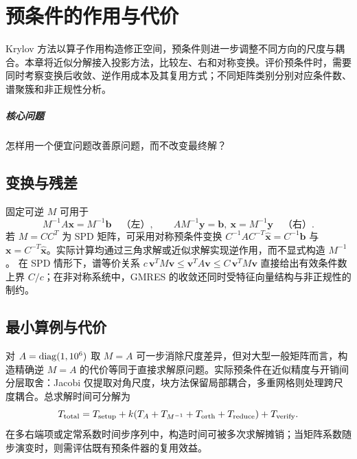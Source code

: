 \chapter{预条件的作用与代价}\label{v0ch:16}
\begin{chaptersummary}
Krylov 方法以算子作用构造修正空间，预条件则进一步调整不同方向的尺度与耦合。本章将近似分解接入投影方法，比较左、右和对称变换。评价预条件时，需要同时考察变换后收敛、逆作用成本及其复用方式；不同矩阵类别分别对应条件数、谱聚簇和非正规性分析。
\end{chaptersummary}
\paragraph{核心问题}怎样用一个便宜问题改善原问题，而不改变最终解？

\section{变换与残差}
固定可逆 $M$ 可用于
\[
 M^{-1}A\bm x=M^{-1}\bm b\quad\text{（左）},\qquad
 AM^{-1}\bm y=\bm b,\ \bm x=M^{-1}\bm y\quad\text{（右）}.
\]
若 $M=CC^T$ 为 SPD 矩阵，可采用对称预条件变换
$C^{-1}AC^{-T}\widehat{\bm x}=C^{-1}\bm b$ 与 $\bm x=C^{-T}\widehat{\bm x}$。实际计算均通过三角求解或近似求解实现逆作用，而不显式构造 $M^{-1}$。
在 SPD 情形下，谱等价关系
$c\,\bm v^TM\bm v\le\bm v^TA\bm v\le C\,\bm v^TM\bm v$
直接给出有效条件数上界 $C/c$；在非对称系统中，GMRES 的收敛还同时受特征向量结构与非正规性的制约。
\section{最小算例与代价}
对 $A=\operatorname{diag}(1,10^6)$ 取 $M=A$ 可一步消除尺度差异，但对大型一般矩阵而言，构造精确逆 $M=A$ 的代价等同于直接求解原问题。实际预条件在近似精度与开销间分层取舍：Jacobi 仅提取对角尺度，块方法保留局部耦合，多重网格则处理跨尺度耦合。总求解时间可分解为
\[
 T_{\rm total}=T_{\rm setup}
 +k(T_A+T_{M^{-1}}+T_{\rm orth}+T_{\rm reduce})
 +T_{\rm verify}.
\]
在多右端项或定常系数时间步序列中，构造时间可被多次求解摊销；当矩阵系数随步演变时，则需评估既有预条件器的复用效益。
